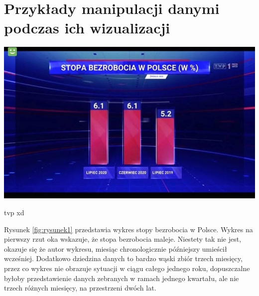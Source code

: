 \documentclass{classrep}
\begin{document}
    \section{Przykłady manipulacji danymi podczas ich wizualizacji} {
              \includegraphics[width=\linewidth]{1.jpg}
              \caption{tvp xd}
              \label{fig:rysunek1}
       \par
       Rysunek \ref{fig:rysunek1} przedstawia wykres stopy bezrobocia w Polsce.
       Wykres na pierwszy rzut oka wskazuje, że stopa bezrobocia maleje. Niestety tak nie jest, okazuje się że autor wykresu,
        miesiąc chronologicznie późniejszy umieścił wcześniej. Dodatkowo dziedzina danych to bardzo wąski zbiór trzech miesięcy,
         przez co wykres nie obrazuje sytuacji w ciągu całego jednego roku, dopuszczalne byłoby przedstawienie danych zebranych
          w ramach jednego kwartału, ale nie trzech różnych miesięcy, na przestrzeni dwóch lat.
       
}
\end{document}
